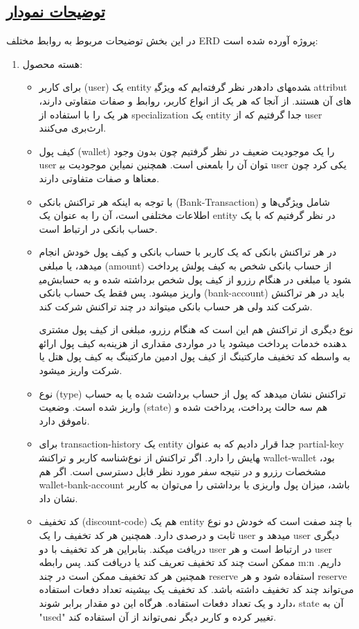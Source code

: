 \subsection*{\underline{توضیحات نمودار}}

در این بخش توضیحات مربوط به روابط مختلف ERD پروژه آورده شده است:

\begin{enumerate}
	\item هسته محصول:
	\begin{itemize}
		\item 
		برای کاربر (user) یک entity در نظر گرفته‌ایم که ویژگی‎های داده‎شده attribut های آن هستند. از آنجا که هر یک از انواع کاربر، روابط و صفات متفاوتی دارند، هر یک را با استفاده از specialization یک entity جدا گرفتیم که از user ارث‌بری می‌کنند.
		\item 
		کیف پول (wallet) را یک موجودیت ضعیف در نظر گرفتیم چون بدون وجود user این موجودیت بی‎معنی است. همچنین نمی‎توان آن را با user یکی کرد چون معناها و صفات متفاوتی دارند.
		\item 
		با توجه به اینکه هر تراکنش بانکی (Bank-Transaction) شامل ویژگی‌ها و اطلاعات مختلفی است، آن را به عنوان یک entity در نظر گرفتیم که با یک حساب بانکی در ارتباط است.
		
		\item 
		در هر تراکنش بانکی که یک کاربر با حساب بانکی و کیف پول خودش انجام میدهد، یا مبلغی (amount) از حساب بانکی شخص به کیف پولش پرداخت می‎شود یا مبلغی در هنگام رزرو از کیف پول شخص برداشته شده و به حسابش واریز میشود.
		پس فقط یک حساب بانکی (bank-account) باید در هر تراکنش شرکت کند ولی هر حساب بانکی میتواند در چند تراکنش شرکت کند.
		
		نوع دیگری از تراکنش هم این است که هنگام رزرو، مبلغی از کیف پول مشتری به کیف پول ارائه‎دهنده خدمات پرداخت میشود یا در مواردی مقداری از هزینه به واسطه کد تخفیف مارکتینگ از کیف پول ادمین مارکتینگ به کیف پول هتل یا شرکت واریز میشود.
		\item 
		نوع (type) تراکنش نشان میدهد که پول از حساب برداشت شده یا به حساب واریز شده است. \linebreak وضعیت (state) هم سه حالت پرداخت، پرداخت شده و ناموفق دارد.
		\item 
		برای transaction-history یک entity جدا قرار دادیم که به عنوان partial-key شناسه کاربر و تراکنش‎هایش را دارد. اگر تراکنش از نوع wallet-wallet بود، مشخصات رزرو و در نتیجه سفر مورد نظر قابل دسترسی است. اگر هم wallet-bank-account باشد، میزان پول واریزی یا برداشتی را می‌توان به کاربر نشان داد.
		\item 
		کد تخفیف (discount-code) هم یک entity با چند صفت است که خودش دو نوع ثابت و درصدی دارد. همچنین هر کد تخفیف را یک user میدهد و user دیگری دریافت میکند. بنابراین هر کد تخفیف با دو user در ارتباط است و هر user ممکن است چند کد تخفیف تعریف کند یا دریافت کند. پس رابطه m:n داریم.
		همچنین هر کد تخفیف ممکن است در چند reserve استفاده شود و هر reserve می‌تواند چند کد تخفیف داشته باشد.
		کد تخفیف یک بیشینه تعداد دفعات استفاده دارد و یک تعداد دفعات استفاده. هرگاه این دو مقدار برابر شوند، state آن به "used" تغییر کرده و کاربر دیگر نمی‌تواند از آن استفاده کند.
		

\end{itemize}
\end{enumerate}
